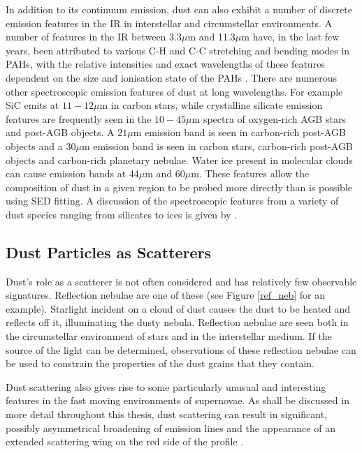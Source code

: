 In addition to its continuum emission, dust can also exhibit a number of discrete emission features in the IR in interstellar and circumstellar environments.  A number of features in the IR between 3.3$\mu$m and 11.3$\mu$m have, in the last few years, been attributed to various {C-H} and {C-C} stretching and bending modes in PAHs, with the relative intensities and exact wavelengths of these features dependent on the size and ionisation state of the PAHs \citep{Draine2001}.  There are numerous other spectroscopic emission features of dust at long wavelengths.  For example SiC emits at $11-12\mu$m in carbon stars, while  crystalline silicate emission features are frequently seen in the $10-45\mu$m spectra of oxygen-rich AGB  stars and post-AGB objects.  A $21\mu$m  emission band  is seen in carbon-rich post-AGB objects and a 30$\mu$m emission band is seen in carbon stars, carbon-rich post-AGB objects and carbon-rich planetary nebulae. Water ice present in  molecular clouds can cause emission bands at 44$\mu$m and $60\mu$m.  These features allow the composition of dust in a given region to be probed more directly than is possible using SED fitting.  A discussion of the spectroscopic features from a variety of dust species ranging from silicates to ices is given by \citet{Draine2003}. 

\subsection{Dust Particles as Scatterers}
\label{scn:le}
Dust's role as a scatterer is not often considered and has relatively few observable signatures.  Reflection nebulae are one of these (see Figure \ref{ref_neb} for an example).  Starlight incident on a cloud of dust causes the dust to be heated and reflects off it,  illuminating the dusty nebula.  Reflection nebulae are seen both in the circumstellar environment of stars and in the interstellar medium.  If the source of the light can be determined, observations of these reflection nebulae can be used to constrain the properties of the dust grains that they contain.  

Dust scattering also gives rise to some particularly unusual and interesting features in the fast moving environments of supernovae.  As shall be discussed in more detail throughout this thesis, dust scattering can result in significant, possibly asymmetrical broadening of emission lines and the appearance of an extended scattering wing on the red side of the profile \citep{Lucy1989}. 

